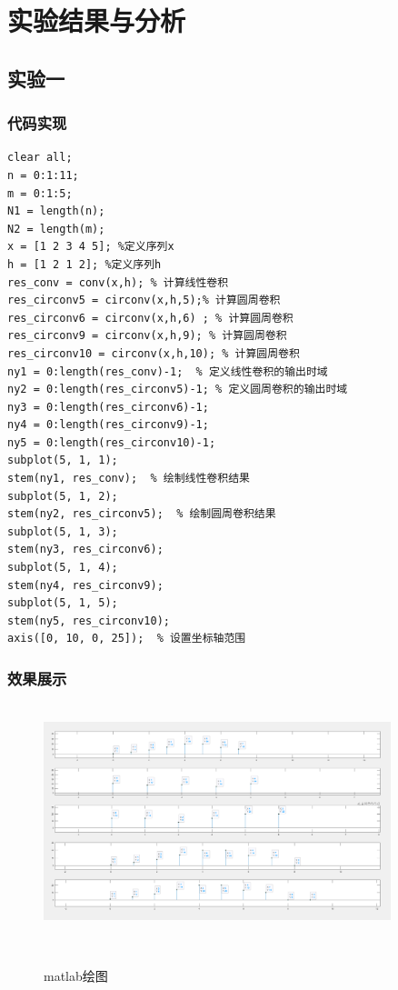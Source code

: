 \documentclass[12pt,hyperref,a4paper,UTF8]{ctexart}
\begin{document}
\section{实验结果与分析}

\subsection{实验一}

\subsubsection{代码实现}
\begin{lstlisting}[style=matlab, caption={实验一MATLAB实现代码}]
% 主函数
clear all;
n = 0:1:11;
m = 0:1:5;
N1 = length(n);
N2 = length(m);
x = [1 2 3 4 5]; %定义序列x
h = [1 2 1 2]; %定义序列h
res_conv = conv(x,h); % 计算线性卷积
res_circonv5 = circonv(x,h,5);% 计算圆周卷积
res_circonv6 = circonv(x,h,6) ; % 计算圆周卷积
res_circonv9 = circonv(x,h,9); % 计算圆周卷积
res_circonv10 = circonv(x,h,10); % 计算圆周卷积
ny1 = 0:length(res_conv)-1;  % 定义线性卷积的输出时域
ny2 = 0:length(res_circonv5)-1; % 定义圆周卷积的输出时域
ny3 = 0:length(res_circonv6)-1;
ny4 = 0:length(res_circonv9)-1;
ny5 = 0:length(res_circonv10)-1;
subplot(5, 1, 1);
stem(ny1, res_conv);  % 绘制线性卷积结果
subplot(5, 1, 2);
stem(ny2, res_circonv5);  % 绘制圆周卷积结果
subplot(5, 1, 3);
stem(ny3, res_circonv6); 
subplot(5, 1, 4);
stem(ny4, res_circonv9); 
subplot(5, 1, 5);
stem(ny5, res_circonv10); 
axis([0, 10, 0, 25]);  % 设置坐标轴范围
\end{lstlisting}
\subsubsection{效果展示}


\begin{figure}[H] %
        \centering
        \includegraphics[width=0.9\textwidth]{figures/301.png} %
        \caption{matlab绘图} %
        \label{fig:example} %
\end{figure}
\end{document}
